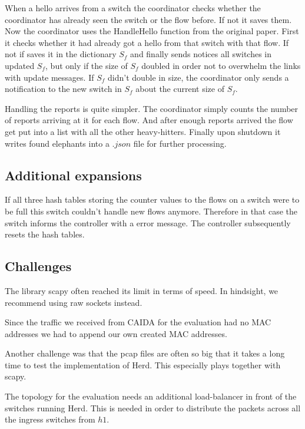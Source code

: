 \documentclass[11pt,oneside,a4paper]{article}
\begin{document}
When a hello arrives from a switch the coordinator checks whether the coordinator has already seen the switch or the flow before. If not it saves them. Now the coordinator uses the HandleHello function from the original paper. First it checks whether it had already got a hello from that switch with that flow. If not if saves it in the dictionary $S_f$ and finally sends notices all switches in updated $S_f$, but only if the size of $S_f$ doubled in order not to overwhelm the links with update messages. If $S_f$ didn't double in size, the coordinator only sends a notification to the new switch in $S_f$ about the current size of $S_f$.

Handling the reports is quite simpler. The coordinator simply counts the number of reports arriving at it for each flow. And after enough reports arrived the flow get put into a list with all the other heavy-hitters. Finally upon shutdown it writes found elephants into a $.json$ file for further processing.\\

\subsection{Additional expansions} \label{special}
If all three hash tables storing the counter values to the flows on a switch were to be full this switch couldn't handle new flows anymore. Therefore in that case the switch informs the controller with a error message. The controller subsequently resets the hash tables. \\

\subsection{Challenges} \label{challenges}
The library scapy often reached its limit in terms of speed. In hindsight, we recommend using raw sockets instead. 

Since the traffic we received from CAIDA for the evaluation had no MAC addresses we had to append our own created MAC addresses. 

Another challenge was that the pcap files are often so big that it takes a long time to test the implementation of Herd. This especially plays together with scapy. 

The topology for the evaluation needs an additional load-balancer in front of the switches running Herd. This is needed in order to distribute the packets across all the ingress switches from $h1$. 
\end{document}
